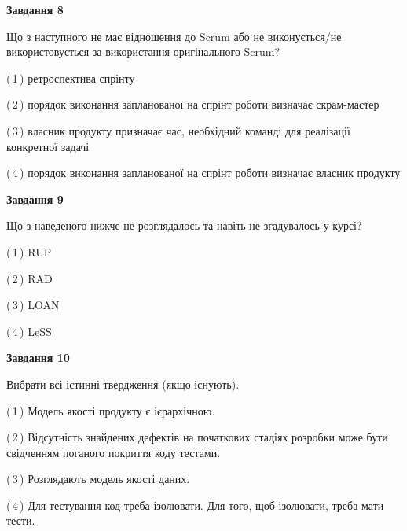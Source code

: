\documentclass[10pt, ukrainian]{article}
\begin{document}
{\begin {large}
{\begin {center}\textbf{Завдання 8}\end {center}}\par
Що з наступного не має відношення до Scrum або не виконується/не використовується за використання оригінального Scrum?\par
\vspace{2mm}



(\,1\,) ретроспектива спрінту%



(\,2\,) порядок виконання запланованої на спрінт роботи визначає скрам-мастер%



(\,3\,) власник продукту призначає час, необхідний команді для реалізації конкретної задачі%



(\,4\,) порядок виконання запланованої на спрінт роботи визначає власник продукту%


{\begin {center}\textbf{Завдання 9}\end {center}}\par
Що з наведеного нижче не розглядалось та навіть не згадувалось у курсі?\par
\vspace{2mm}



(\,1\,) RUP%



(\,2\,) RAD%



(\,3\,) LOAN%



(\,4\,) LeSS%


{\begin {center}\textbf{Завдання 10}\end {center}}\par
Вибрати всі істинні твердження (якщо існують).\par
\vspace{2mm}



(\,1\,) Модель якості продукту є ієрархічною.%



(\,2\,) Відсутність знайдених дефектів на початкових стадіях розробки може бути свідченням поганого покриття коду тестами.%



(\,3\,) Розглядають модель якості даних.%



(\,4\,) Для тестування код треба ізолювати. Для того, щоб ізолювати, треба мати тести.%



\end {large}}
\end{document}
